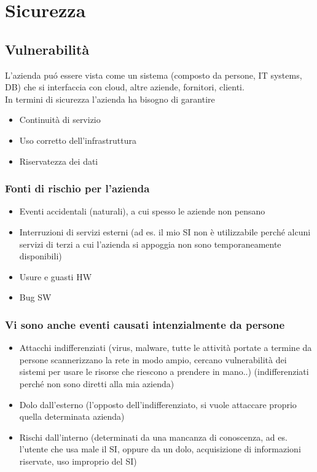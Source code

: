 \chapter{Sicurezza}

\section{Vulnerabilit\`a}

L'azienda pu\'o essere vista come un sistema (composto da persone, IT
systems, DB) che si interfaccia con cloud, altre aziende, fornitori,
clienti.\\
In termini di sicurezza l'azienda ha bisogno di garantire

\begin{itemize}

\item
  Continuit\`a di servizio
\item
  Uso corretto dell'infrastruttura
\item
  Riservatezza dei dati
\end{itemize}

\subsection{Fonti di rischio per l'azienda}

\begin{itemize}

\item
  Eventi accidentali (naturali), a cui spesso le aziende non pensano
\item
  Interruzioni di servizi esterni (ad es. il mio SI non \`e utilizzabile
  perch\'e alcuni servizi di terzi a cui l'azienda si appoggia non sono
  temporaneamente disponibili)
\item
  Usure e guasti HW
\item
  Bug SW
\end{itemize}

\subsection{Vi sono anche eventi causati intenzialmente da persone}

\begin{itemize}

\item
  Attacchi indifferenziati (virus, malware, tutte le attivit\`a portate a
  termine da persone scannerizzano la rete in modo ampio, cercano
  vulnerabilit\`a dei sistemi per usare le risorse che riescono a prendere
  in mano..) (indifferenziati perch\'e non sono diretti alla mia azienda)
\item
  Dolo dall'esterno (l'opposto dell'indifferenziato, si vuole attaccare
  proprio quella determinata azienda)
\item
  Rischi dall'interno (determinati da una mancanza di conoscenza, ad es.
  l'utente che usa male il SI, oppure da un dolo, acquisizione di
  informazioni riservate, uso improprio del SI)
\end{itemize}

